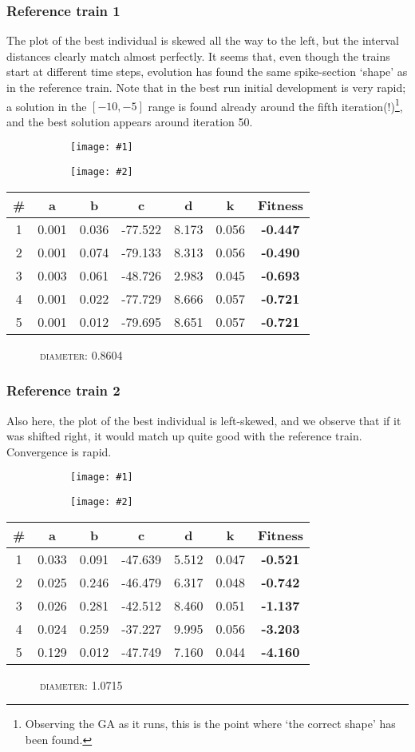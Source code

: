 \documentclass[a4paper,9pt]{article}
\newcommand{\tightit}{\vspace{-5pt}}
\newcommand{\casedata}[4]{
    \begin{figure}[!h]
        \centering
        \begin{subfigure}{.5\textwidth}
          \centering
          \texttt{[image: \#1]}
        \end{subfigure}%
        \begin{subfigure}{.5\textwidth}
          \centering
          \texttt{[image: \#2]}
        \end{subfigure}
    \end{figure}

    { \scriptsize
    \begin{tabular}{c|c|c|c|c|c||c}
    \textbf{\#} & \textbf{a} & \textbf{b} & \textbf{c} & 
      \textbf{d} & \textbf{k} & \textbf{Fitness} \\ \hline
      #3
    \end{tabular} 
    \textsc{~~~~~~diameter:} #4
    \ \\
    }
}
\begin{document}
\subsubsection{Reference train 1}
\tightit
The plot of the best individual is skewed all the way to the left, but the
interval distances clearly match almost perfectly. It seems that, even though
the trains start at different time steps, evolution has found the same
spike-section `shape' as in the reference train. Note that in the best run
initial development is very rapid; a solution in the $[-10, -5]$ range is
found already around the fifth iteration(!)\footnote{Observing the GA as it
runs, this is the point where `the correct shape' has been found.}, and the
best solution appears around iteration 50.

\casedata{../data/izzy-train1.dat_spike-interval_3.png}
         {../data/izzy-train1.dat_spike-interval_3.dev.png}
         {
1 & 0.001 & 0.036 & -77.522 & 8.173 & 0.056 &\textbf{-0.447} \\ \hline
2 & 0.001 & 0.074 & -79.133 & 8.313 & 0.056 &\textbf{-0.490} \\ \hline
3 & 0.003 & 0.061 & -48.726 & 2.983 & 0.045 &\textbf{-0.693} \\ \hline
4 & 0.001 & 0.022 & -77.729 & 8.666 & 0.057 &\textbf{-0.721} \\ \hline
5 & 0.001 & 0.012 & -79.695 & 8.651 & 0.057 &\textbf{-0.721} \\ \hline
         }
         {0.8604}


\subsubsection{Reference train 2}
\tightit
Also here, the plot of the best individual is left-skewed, and we observe that
if it was shifted right, it would match up quite good with the reference
train. Convergence is rapid.


\casedata{../data/izzy-train2.dat_spike-interval_2.png}
         {../data/izzy-train2.dat_spike-interval_2.dev.png}
         {
1 & 0.033 & 0.091 & -47.639 & 5.512 & 0.047 &\textbf{-0.521} \\ \hline
2 & 0.025 & 0.246 & -46.479 & 6.317 & 0.048 &\textbf{-0.742} \\ \hline
3 & 0.026 & 0.281 & -42.512 & 8.460 & 0.051 &\textbf{-1.137} \\ \hline
4 & 0.024 & 0.259 & -37.227 & 9.995 & 0.056 &\textbf{-3.203} \\ \hline
5 & 0.129 & 0.012 & -47.749 & 7.160 & 0.044 &\textbf{-4.160} \\ \hline
         }
         {1.0715}
\end{document}
